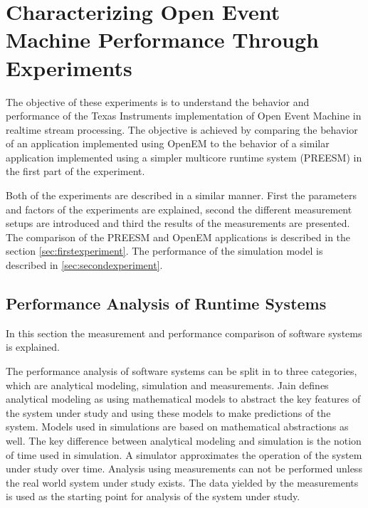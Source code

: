 \chapter [OpenEM Experiments] {Characterizing Open Event Machine Performance
Through Experiments}
\label{chapter:experiments}
The objective of these experiments is to understand the behavior and
performance of the Texas Instruments implementation of Open Event Machine in
realtime stream processing. The objective is achieved by comparing the behavior
of an application implemented using OpenEM to the behavior of a similar
application implemented using a simpler multicore runtime system (PREESM) in the
first part of the experiment. 

Both of the experiments are described in a similar manner. First the parameters
and factors of the experiments are explained, second the different measurement
setups are introduced and third the results of the measurements are presented.
The comparison of the PREESM and OpenEM applications is described in the section
\ref{sec:firstexperiment}. The performance of the simulation model is described
in \ref{sec:secondexperiment}.


\section{Performance Analysis of Runtime Systems}
\label{sec:perfanalysis}
In this section the measurement and performance comparison of software systems
is explained.

The performance analysis of software systems can be split in to three
categories, which are analytical modeling, simulation and measurements. Jain
defines analytical modeling as using mathematical models to abstract the key
features of the system under study and using these models to make predictions of
the system. Models used in simulations are based on mathematical abstractions as
well. The key difference between analytical modeling and simulation is the
notion of time used in simulation. A simulator approximates the operation of
the system under study over time.  Analysis using measurements can
not be performed unless the real world system under study exists. The data
yielded by the measurements is used as the starting point for analysis of the
system under study. \cite{jain1991art}

